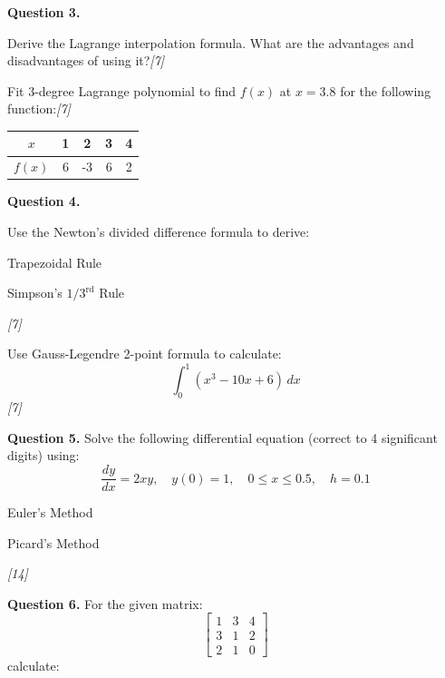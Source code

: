 \documentclass[11pt,a4paper]{article}
\newcommand{\pts}[1]{\hfill   \textit{[#1]}}
\begin{document}
\medskip


\noindent   \textbf{Question 3.}

\begin{parts}
  \item Derive the Lagrange interpolation formula. What are the advantages and disadvantages of using it?\pts{7}
  \item Fit 3-degree Lagrange polynomial to find $f(x)$ at $x = 3.8$ for the following function:\pts{7}
  
\begin{center}
  
\begin{tabular}{|c|c|c|c|c|}
    \hline
    $x$ & 1 & 2 & 3 & 4 \\
    \hline
    $f(x)$ & 6 & -3 & 6 & 2 \\
    \hline
  \end{tabular}
  \end{center}
\end{parts}

\medskip


\noindent   \textbf{Question 4.}

\begin{parts}
  \item Use the Newton's divided difference formula to derive:
  
\begin{parts}
    \item Trapezoidal Rule
    \item Simpson's $1/3^{ \text{rd}}$ Rule
  \end{parts}\pts{7}
  \item Use Gauss-Legendre 2-point formula to calculate:
  \[ \int_{0}^{1} (x^3 - 10x + 6) \, dx \]\pts{7}
\end{parts}

\medskip


\noindent   \textbf{Question 5.} Solve the following differential equation (correct to 4 significant digits) using:
\[ \frac{dy}{dx} = 2xy, \quad y(0) = 1, \quad 0 \le x \le 0.5, \quad h = 0.1 \]

\begin{parts}
  \item Euler's Method
  \item Picard's Method
\end{parts}\pts{14}

\medskip


\noindent   \textbf{Question 6.} For the given matrix:
\[ 
\begin{bmatrix} 1 & 3 & 4 \\ 3 & 1 & 2 \\ 2 & 1 & 0 \end{bmatrix} \]
calculate:
\end{document}
